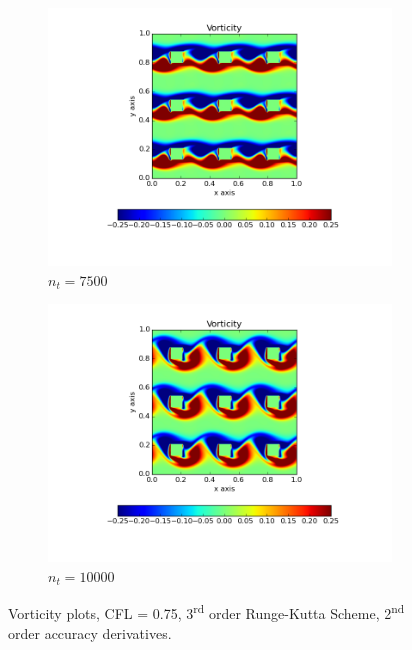 \documentclass[10pt, a4paper]{article}
\begin{document}
\begin{figure}[htb!]
\begin{subfigure}{.5\textwidth}
  \includegraphics[width=1.1\linewidth, clip=true, trim=1cm 1cm 1cm 1cm]{q4_0003}
  \caption{$n_t = 7500$}
  \label{fig:sub1}
\end{subfigure}%
\begin{subfigure}{.5\textwidth}
  \centering
  \includegraphics[width=1.1\linewidth, clip=true, trim=1cm 1cm 1cm 1cm]{q4_0004}
  \caption{$n_t = 10000$}
  \label{fig:sub2}
\end{subfigure}
\caption{Vorticity plots, CFL = 0.75, 3\textsuperscript{rd} order Runge-Kutta Scheme, 2\textsuperscript{nd} order accuracy derivatives.}
\label{fig:test}
\end{figure}


\end{document}
